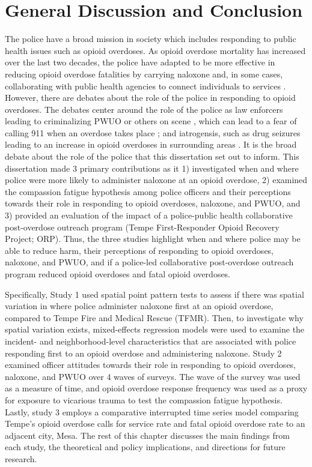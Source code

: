 \chapter{General Discussion and Conclusion}

The police have a broad mission in society which includes responding to public health issues such as opioid overdoses. As opioid overdose mortality has increased over the last two decades, the police have adapted to be more effective in reducing opioid overdose fatalities by carrying naloxone and, in some cases, collaborating with public health agencies to connect individuals to services \parencite{formica_characteristics_2021, ray_national_2023}. However, there are debates about the role of the police in responding to opioid overdoses. The debates center around the role of the police as law enforcers leading to criminalizing PWUO or others on scene \parencite{carroll_police_2023,lowder_twoyear_2020, bohnert_policing_2011}, which can lead to a fear of calling 911 when an overdose takes place \parencite{van_der_meulen_thats_2021}; and iatrogensis, such as drug seizures leading to an increase in opioid overdoses in surrounding areas \parencite{ray_spatiotemporal_2023}. It is the broad debate about the role of the police that this dissertation set out to inform. This dissertation made 3 primary contributions as it 1) investigated when and where police were more likely to administer naloxone at an opioid overdose, 2) examined the compassion fatigue hypothesis among police officers and their perceptions towards their role in responding to opioid overdoses, naloxone, and PWUO, and 3) provided an evaluation of the impact of a police-public health collaborative post-overdose outreach program (Tempe First-Responder Opioid Recovery Project; ORP). Thus, the three studies highlight when and where police may be able to reduce harm, their perceptions of responding to opioid overdoses, naloxone, and PWUO, and if a police-led collaborative post-overdose outreach program reduced opioid overdoses and fatal opioid overdoses.

Specifically, Study 1 used spatial point pattern tests to assess if there was spatial variation in where police administer naloxone first at an opioid overdose, compared to Tempe Fire and Medical Rescue (TFMR). Then, to investigate why spatial variation exists, mixed-effects regression models were used to examine the incident- and neighborhood-level characteristics that are associated with police responding first to an opioid overdose and administering naloxone. Study 2 examined officer attitudes towards their role in responding to opioid overdoses, naloxone, and PWUO over 4 waves of surveys. The wave of the survey was used as a measure of time, and opioid overdose response frequency was used as a proxy for exposure to vicarious trauma to test the compassion fatigue hypothesis. Lastly, study 3 employs a comparative interrupted time series model comparing Tempe's opioid overdose calls for service rate and fatal opioid overdose rate to an adjacent city, Mesa. The rest of this chapter discusses the main findings from each study, the theoretical and policy implications, and directions for future research.

